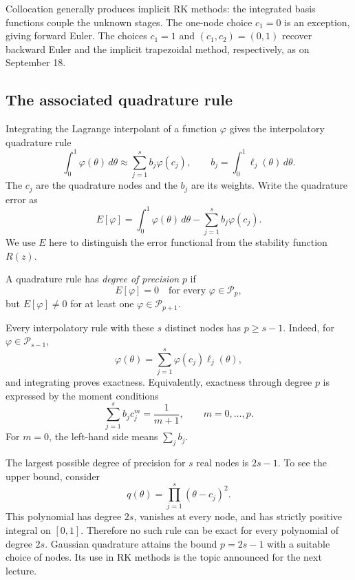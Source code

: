 Collocation generally produces implicit RK methods: the integrated
basis functions couple the unknown stages. The one-node choice
\(c_1=0\) is an exception, giving forward Euler. The choices
\(c_1=1\) and \((c_1,c_2)=(0,1)\) recover backward Euler and the
implicit trapezoidal method, respectively, as on September 18.

\subsection{The associated quadrature rule}

Integrating the Lagrange interpolant of a function \(\varphi\) gives
the interpolatory quadrature rule
\begin{equation}\label{eq:quadrature-rule-sep-21}
 \int_0^1\varphi(\theta)\,d\theta
   \approx\sum_{j=1}^s b_j\varphi(c_j),
 \qquad b_j=\int_0^1\ell_j(\theta)\,d\theta.
\end{equation}
The \(c_j\) are the quadrature nodes and the \(b_j\) are its weights.
Write the quadrature error as
\[
 E[\varphi]=\int_0^1\varphi(\theta)\,d\theta
              -\sum_{j=1}^s b_j\varphi(c_j).
\]
We use \(E\) here to distinguish the error functional from the
stability function \(R(z)\).

\begin{definition}
 A quadrature rule has \emph{degree of precision} \(p\) if
 \[
  E[\varphi]=0\quad\text{for every }\varphi\in\mathcal P_p,
 \]
 but \(E[\varphi]\neq0\) for at least one
 \(\varphi\in\mathcal P_{p+1}\).
\end{definition}

Every interpolatory rule with these \(s\) distinct nodes has
\(p\geq s-1\). Indeed, for \(\varphi\in\mathcal P_{s-1}\),
\[
 \varphi(\theta)=\sum_{j=1}^s\varphi(c_j)\ell_j(\theta),
\]
and integrating proves exactness. Equivalently, exactness through
degree \(p\) is expressed by the moment conditions
\begin{equation}\label{eq:quadrature-moments-sep-21}
 \sum_{j=1}^s b_jc_j^m=\frac1{m+1},
 \qquad m=0,\ldots,p.
\end{equation}
For \(m=0\), the left-hand side means \(\sum_j b_j\).

The largest possible degree of precision for \(s\) real nodes is
\(2s-1\). To see the upper bound, consider
\[
 q(\theta)=\prod_{j=1}^s(\theta-c_j)^2.
\]
This polynomial has degree \(2s\), vanishes at every node, and has
strictly positive integral on \([0,1]\). Therefore no such rule can
be exact for every polynomial of degree \(2s\).
Gaussian quadrature attains the bound \(p=2s-1\) with a suitable
choice of nodes. Its use in RK methods is the topic announced for
the next lecture.

